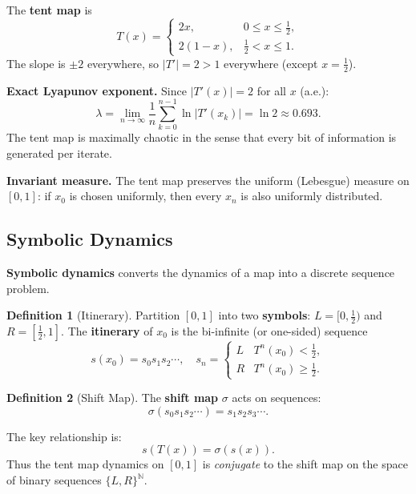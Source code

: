 \documentclass[11pt,letterpaper]{article}
\theoremstyle{definition}
\newtheorem{definition}{Definition}[section]
\theoremstyle{plain}
\theoremstyle{remark}
\begin{document}
The \textbf{tent map} is
\begin{equation}\label{eq:tent}
  T(x) = \begin{cases} 2x, & 0 \le x \le \tfrac{1}{2}, \\
                        2(1-x), & \tfrac{1}{2} < x \le 1. \end{cases}
\end{equation}
The slope is $\pm 2$ everywhere, so $|T'| = 2 > 1$ everywhere (except
$x=\tfrac{1}{2}$).

\textbf{Exact Lyapunov exponent.}  Since $|T'(x)| = 2$ for all $x$ (a.e.):
\[
  \lambda = \lim_{n\to\infty}\frac{1}{n}\sum_{k=0}^{n-1}\ln|T'(x_k)|
  = \ln 2 \approx 0.693.
\]
The tent map is maximally chaotic in the sense that every bit of
information is generated per iterate.

\textbf{Invariant measure.}  The tent map preserves the uniform
(Lebesgue) measure on $[0,1]$: if $x_0$ is chosen uniformly, then
every $x_n$ is also uniformly distributed.

\subsection{Symbolic Dynamics}

\textbf{Symbolic dynamics} converts the dynamics of a map into a
discrete sequence problem.

\begin{definition}[Itinerary]
Partition $[0,1]$ into two \textbf{symbols}: $L = [0,\tfrac{1}{2})$
and $R = [\tfrac{1}{2},1]$.  The \textbf{itinerary} of $x_0$ is the
bi-infinite (or one-sided) sequence
\[
  s(x_0) = s_0 s_1 s_2 \cdots, \quad s_n = \begin{cases} L & T^n(x_0) < \tfrac{1}{2}, \\ R & T^n(x_0) \ge \tfrac{1}{2}. \end{cases}
\]
\end{definition}

\begin{definition}[Shift Map]
The \textbf{shift map} $\sigma$ acts on sequences:
\[
  \sigma(s_0 s_1 s_2 \cdots) = s_1 s_2 s_3 \cdots.
\]
\end{definition}

The key relationship is:
\begin{equation}
  s(T(x)) = \sigma(s(x)).
\end{equation}
Thus the tent map dynamics on $[0,1]$ is \emph{conjugate} to the shift
map on the space of binary sequences $\{L,R\}^{\mathbb{N}}$.
\end{document}
